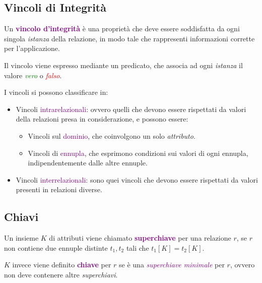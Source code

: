 \subsection{Vincoli di Integrità}
Un \textbf{\textcolor{purple}{vincolo d'integrità}} è una proprietà che deve
essere soddisfatta da ogni singola \emph{istanza} della relazione, in modo tale che rappresenti informazioni
corrette per l'applicazione.

Il vincolo viene espresso mediante un predicato, che associa ad ogni \emph{istanza} il valore \emph{\textcolor{Green}{vero}}
o \emph{\textcolor{red}{falso}}.

I vincoli si possono classificare in:
\begin{itemize}
    \item Vincoli \textcolor{purple}{intrarelazionali}: ovvero quelli che devono essere rispettati da valori della relazioni presa in considerazione, e possono essere:
        \begin{itemize}
            \item Vincoli sul \textcolor{purple}{dominio}, che coinvolgono un solo \emph{attributo}.
            \item Vincoli di \textcolor{purple}{ennupla}, che esprimono condizioni sui valori di ogni ennupla, indipendentemente dalle altre ennuple.
        \end{itemize}
    \item Vincoli \textcolor{purple}{interrelazionali}: sono quei vincoli che devono essere rispettati da valori presenti in relazioni diverse.
\end{itemize}

\subsection{Chiavi}

\begin{definition}[Superchiave]
    Un insieme $K$ di attributi viene chiamato \textbf{\textcolor{purple}{superchiave}} per una
    relazione $r$, se $r$ non contiene due ennuple distinte $t_1, t_2$ tali che $t_1[K] = t_2[K]$.
\end{definition}

\begin{definition}[Chiave]
    $K$ invece viene definito \textbf{\textcolor{purple}{chiave}} per $r$ se è una \emph{\textcolor{purple}{superchiave minimale}} per $r$, ovvero
    non deve contenere altre \emph{superchiavi}.
\end{definition}

